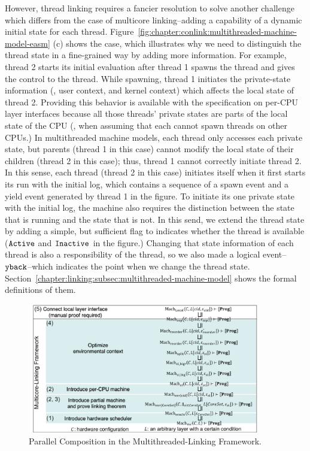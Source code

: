 However, thread linking requires a fancier resolution to solve another challenge which differs from the case of multicore linking--adding a capability of a dynamic initial state for each thread.
Figure~\ref{fig:chapter:conlink:multithreaded-machine-model-easm} (c) 
shows the case, which illustrates why we need to distinguish the thread state in a fine-grained way by adding more information. 
For example, thread 2 starts its initial evaluation after thread 1 spawns the thread and gives the control to the thread. 
While spawning, thread 1 initiates the private-state information (\eg, user context, and kernel context) which affects the local state of thread 2. 
Providing this behavior is available with the specification on per-CPU layer interfaces because all those threads' private states are parts of the local state of the CPU (\ie, when assuming that each cannot spawn threads on other CPUs.)
In multithreaded machine models, each thread only accesses each private state, but
parents (thread 1 in this case) cannot modify the local state of their children (thread 2 in this case); thus, thread 1 cannot correctly initiate thread 2.
In this sense,
each thread (thread 2 in this case) initiates itself when it first starts its run with the initial log,
which contains a sequence of a spawn event and a yield event generated by thread 1 in the figure. 
To initiate its one private state with the initial log, 
the machine also requires the distinction between the state that is running and the state that is not.
In this send, we extend the thread state by adding a simple, but sufficient flag to indicates whether the thread is available (${\mathrm{\texttt{Active}}}$ and ${\mathrm{\texttt{Inactive}}}$ in the figure.)
Changing that state information of each thread is also a responsibility of the thread,
so we also made a logical event--${\mathrm{\texttt{yback}}}$--which indicates the point when we change the thread state.
Section~\ref{chapter:linking:subsec:multithreaded-machine-model} shows the formal definitions of them. 

\begin{figure}
\begin{center}
\includegraphics[width=0.9\textwidth, page=6]{figs/conlink/concurrent_linking}
\end{center}
\caption{Parallel Composition in the Multithreaded-Linking Framework.}
\label{fig:chapter:conlink:parallel-composition-in-easm}
\end{figure}

